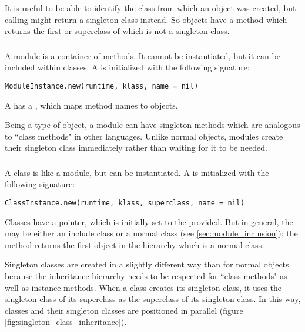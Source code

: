 It is useful to be able to identify the class from which an object was created, but calling  might return a singleton class instead. So objects have a  method which returns the first  or superclass of  which is not a singleton class.

\subsubsection{}

A module is a container of methods. It cannot be instantiated, but it can be included within classes. A  is initialized with the following signature:

\begin{lstlisting}
ModuleInstance.new(runtime, klass, name = nil)
\end{lstlisting}

A  has a , which maps method names to  objects.

Being a type of object, a module can have singleton methods which are analogous to ``class methods" in other languages. Unlike normal objects, modules create their singleton class immediately rather than waiting for it to be needed.

\subsubsection{}

A class is like a module, but can be instantiated. A  is initialized with the following signature:

\begin{lstlisting}
ClassInstance.new(runtime, klass, superclass, name = nil)
\end{lstlisting}

Classes have a  pointer, which is initially set to the  provided. But in general, the  may be either an include class or a normal class (see \ref{sec:module_inclusion}); the  method returns the first object in the  hierarchy which is a normal class.

Singleton classes are created in a slightly different way than for normal objects because the inheritance hierarchy needs to be respected for ``class methods" as well as instance methods. When a class creates its singleton class, it uses the singleton class of its superclass as the superclass of its singleton class. In this way, classes and their singleton classes are positioned in parallel (figure \ref{fig:singleton_class_inheritance}).


